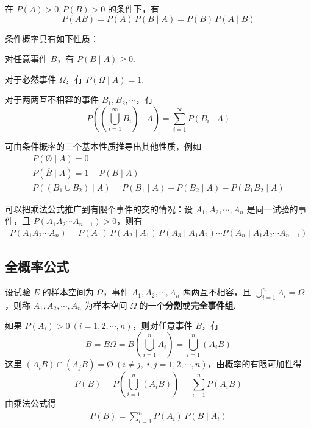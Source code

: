 在 $P(A)>0,P(B)>0$ 的条件下，有
$$
P(AB) = P(A) \, P(B \mid A) = P(B) \, P(A \mid B)
$$

条件概率具有如下性质：

\setcounter{propertyname}{0}

\begin{property}[(非负性)]
    对任意事件 $B$，有 $P(B \mid A) \geqslant 0$.
\end{property}

\begin{property}[(规范性)]
    对于必然事件 $\varOmega$，有 $P(\varOmega \mid A)=1$.
\end{property}

\begin{property}[(可列可加性)]
    对于两两互不相容的事件 $B_1,B_2,\cdots$，有
    $$
    P(\left( \bigcup_{i=1}^\infty B_i \right) \mid A)=\sum_{i=1}^\infty P(B_i \mid A)
    $$
\end{property}

可由条件概率的三个基本性质推导出其他性质，例如
\begin{gather*}
    P(\text{\O} \mid A)=0\\
    P(\overline{B} \mid A) = 1 - P(B \mid A)\\
    P((B_1 \cup B_2) \mid A) = P(B_1 \mid A) + P(B_2 \mid A) - P(B_1 B_2 \mid A)
\end{gather*}

可以把乘法公式推广到有限个事件的交的情况：设 $A_1,A_2,\cdots,A_n$ 是同一试验的事件，且 $P(A_1 A_2 \cdots A_{n-1})>0$，则有
\begin{gather} \label{equation:normal multiply}
    P(A_1 A_2 \cdots A_n) = P(A_1) \, P(A_2 \mid A_1) \, P(A_3 \mid A_1 A_2) \cdots P(A_n \mid A_1 A_2 \cdots A_{n-1})
\end{gather}

\subsection{全概率公式}

设试验 $E$ 的样本空间为 $\varOmega$，事件 $A_1,A_2,\cdots,A_n$ 两两互不相容，且 $\displaystyle\bigcup_{i=1}^n A_i=\varOmega$，则称 $A_1,A_2,\cdots,A_n$ 为样本空间 $\varOmega$ 的一个\textbf{分割}或\textbf{完全事件组}.

如果 $P(A_i)>0 \ (i=1,2,\cdots,n)$，则对任意事件 $B$，有
$$
B = B \varOmega = B \left( \bigcup_{i=1}^n A_i \right) = \bigcup_{i=1}^n(A_i B)
$$
这里 $(A_i B) \cap (A_j B) = \text{\O} \ (i\not=j,\; i,j=1,2,\cdots,n)$，由概率的有限可加性得
$$
P(B) = P(\bigcup_{i=1}^n (A_i B)) = \sum_{i=1}^n P(A_i B)
$$
由乘法公式得
\begin{gather} \label{equation:total}
    P(B) = \sum_{i=1}^n P(A_i) \, P(B \mid A_i)
\end{gather}

